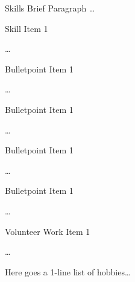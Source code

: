\documentclass{template}
\begin{document}
\header{} %


\begin{skills}{Skills Brief Paragraph \ldots}
    \item Skill Item 1
    \item \ldots
\end{skills}

\begin{employmenthistory}
\begin{bulletpoints}
    \item Bulletpoint Item 1
    \item \ldots
\end{bulletpoints}

\begin{bulletpoints}
    \item Bulletpoint Item 1
    \item \ldots
\end{bulletpoints}
\begin{bulletpoints}
    \item Bulletpoint Item 1
    \item \ldots
\end{bulletpoints}

\begin{bulletpoints}
    \item Bulletpoint Item 1
    \item \ldots
\end{bulletpoints}
\end{employmenthistory}

\begin{volunteerwork}
    \item Volunteer Work Item 1
    \item \ldots
\end{volunteerwork}

\begin{hobbies}
    Here goes a 1-line list of hobbies\ldots
\end{hobbies}
\end{document}
